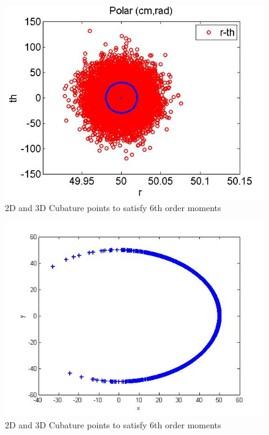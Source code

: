 \documentclass{beamer}
\begin{document}
\begin{frame}
   \begin{figure}[thpb]
      \centering
      \includegraphics[width=1\textwidth]{polar}
      \caption{2D and 3D Cubature points to satisfy 6th order moments}
      \label{fig:23d4m1}
   \end{figure} 
\end{frame}
\begin{frame}
   \begin{figure}[thpb]
      \centering
      \includegraphics[width=1\textwidth]{polartocart2}
      \caption{2D and 3D Cubature points to satisfy 6th order moments}
      \label{fig:23d4m1}
   \end{figure} 
\end{frame}
\end{document}
